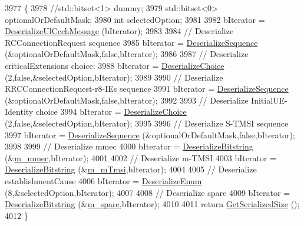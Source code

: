 \begin{DoxyCode}
3977 \{
3978   \textcolor{comment}{//std::bitset<1> dummy;}
3979   std::bitset<0> optionalOrDefaultMask;
3980   \textcolor{keywordtype}{int} selectedOption;
3981 
3982   bIterator = \hyperlink{classns3_1_1RrcUlCcchMessage_a763d3d5779d53fe7244be7a0f25e4cba}{DeserializeUlCcchMessage} (bIterator);
3983 
3984   \textcolor{comment}{// Deserialize RCConnectionRequest sequence}
3985   bIterator = \hyperlink{classns3_1_1Asn1Header_a58c68bb97ba3fe2e8fcdd7c208d672b2}{DeserializeSequence} (&optionalOrDefaultMask,\textcolor{keyword}{false},bIterator);
3986 
3987   \textcolor{comment}{// Deserialize criticalExtensions choice:}
3988   bIterator = \hyperlink{classns3_1_1Asn1Header_a0af5881f07a0549a8693a1b75c229a90}{DeserializeChoice} (2,\textcolor{keyword}{false},&selectedOption,bIterator);
3989 
3990   \textcolor{comment}{// Deserialize RRCConnectionRequest-r8-IEs sequence}
3991   bIterator = \hyperlink{classns3_1_1Asn1Header_a58c68bb97ba3fe2e8fcdd7c208d672b2}{DeserializeSequence} (&optionalOrDefaultMask,\textcolor{keyword}{false},bIterator);
3992 
3993   \textcolor{comment}{// Deserialize InitialUE-Identity choice}
3994   bIterator = \hyperlink{classns3_1_1Asn1Header_a0af5881f07a0549a8693a1b75c229a90}{DeserializeChoice} (2,\textcolor{keyword}{false},&selectedOption,bIterator);
3995 
3996   \textcolor{comment}{// Deserialize S-TMSI sequence}
3997   bIterator = \hyperlink{classns3_1_1Asn1Header_a58c68bb97ba3fe2e8fcdd7c208d672b2}{DeserializeSequence} (&optionalOrDefaultMask,\textcolor{keyword}{false},bIterator);
3998 
3999   \textcolor{comment}{// Deserialize mmec}
4000   bIterator = \hyperlink{classns3_1_1Asn1Header_adb34498b05e8562fba5d40f49578968d}{DeserializeBitstring} (&\hyperlink{classns3_1_1RrcConnectionRequestHeader_abab1a31ce6a91e3d27bc67b0669ad204}{m\_mmec},bIterator);
4001 
4002   \textcolor{comment}{// Deserialize m-TMSI}
4003   bIterator = \hyperlink{classns3_1_1Asn1Header_adb34498b05e8562fba5d40f49578968d}{DeserializeBitstring} (&\hyperlink{classns3_1_1RrcConnectionRequestHeader_acbd02a83e227f832fe6c0143d74737e3}{m\_mTmsi},bIterator);
4004 
4005   \textcolor{comment}{// Deserialize establishmentCause}
4006   bIterator = \hyperlink{classns3_1_1Asn1Header_a4fcc253e0eec3483c775b005c1875f2d}{DeserializeEnum} (8,&selectedOption,bIterator);
4007 
4008   \textcolor{comment}{// Deserialize spare}
4009   bIterator = \hyperlink{classns3_1_1Asn1Header_adb34498b05e8562fba5d40f49578968d}{DeserializeBitstring} (&\hyperlink{classns3_1_1RrcConnectionRequestHeader_a717284d392b79a8344d76bb526e7f6fc}{m\_spare},bIterator);
4010 
4011   \textcolor{keywordflow}{return} \hyperlink{classns3_1_1Asn1Header_a18a67eb7869c5784f59d197bbd76a74f}{GetSerializedSize} ();
4012 \}
\end{DoxyCode}


